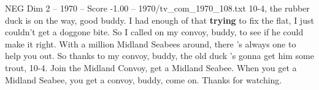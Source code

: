 \begin{textsample}{NEG Dim 2 – 1970 – Score -1.00 – 1970/tv\_com\_1970\_108.txt}  \label{ex:f2_neg_048}
10-4, the rubber duck is on the way, good buddy.
I had enough of that \textbf{trying} to fix the flat, I just couldn't get a doggone bite.
So I called on my convoy, buddy, to see if he could make it right.
With a million Midland Seabees around, there 's always one to help you out.
So thanks to my convoy, buddy, the old duck 's gonna get him some trout, 10-4.
Join the Midland Convoy, get a Midland Seabee.
When you get a Midland Seabee, you get a convoy, buddy, come on.
Thanks for watching.

\end{textsample}
